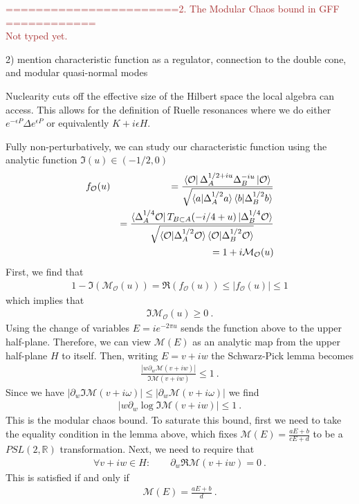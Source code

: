 \documentclass[a4paper,11pt]{article}
\theoremstyle{definition}
\newcommand{\nn}{\nonumber}
\newcommand{\mO}{\mathcal{O}}
\newcommand{\mM}{\mathcal{M}}
\newcommand{\p}{\partial}
\newcommand{\KL}[1]{\textcolor{brown}{#1}}
\begin{document}
\KL{=======================2. The Modular Chaos bound in GFF ============}\\
\KL{Not typed yet.}




2) mention characteristic function as a regulator, connection to the double cone, and modular quasi-normal modes

Nuclearity cuts off the effective size of the Hilbert space the local algebra can access. This allows for the definition of Ruelle resonances where we do either $e^{-\epsilon P} \Delta e^{\epsilon P}$ or equivalently $K+i \epsilon H$.

Fully non-perturbatively, we can study our characteristic function using the analytic function $\Im(u)\in (-1/2,0)$
\begin{eqnarray}
    f_\mO(u)&&=\frac{\bra{\mO}\Delta_A^{1/2+iu}\Delta_B^{-iu}\ket{\mO}}{\sqrt{\braket{a|\Delta_A^{1/2}a}\braket{b|\Delta_B^{1/2}b}}}\\
    &&=\frac{\bra{\Delta_A^{1/4}\mO} T_{B\subset A}(-i/4+u)\ket{\Delta_B^{1/4} \mO}}{\sqrt{\braket{\mO|\Delta_A^{1/2}\mO}\braket{\mO|\Delta_B^{1/2}\mO}}}\nn\\
    &&=1+i \mathcal{M}_{\mO}(u)
\end{eqnarray}
First, we find that 
\begin{eqnarray}
    1-\Im(\mathcal{M}_\mO(u))=\Re(f_\mO(u))\leq |f_\mO(u)|\leq 1
\end{eqnarray}
which implies that 
\begin{eqnarray}
    \Im\mathcal{M}_\mO(u)\geq 0\ .
\end{eqnarray}
Using the change of variables $E=ie^{-2\pi u}$ sends the function above to the upper half-plane. Therefore, we can view $\mM(E)$ as an analytic map from the upper half-plane $H$ to itself. Then, writing $E=v+iw$ the Schwarz-Pick lemma becomes
\begin{eqnarray}
    \frac{|w \p_w \mM(v+iw)|}{\Im \mM(v+iw)}\leq 1\ . 
\end{eqnarray}
Since we have $|\p_w \Im\mM(v+i\omega)|\leq |\p_w \mM(v+i\omega)|$ we find
\begin{eqnarray}
    |w\p_w \log \Im \mM(v+iw)|\leq 1\ .
\end{eqnarray}
This is the modular chaos bound. To saturate this bound, first we need to take the equality condition in the lemma above, which fixes $\mM(E)=\frac{a E+b}{c E+d}$ to be a $PSL(2,\mathbb{R})$ transformation. Next, we need to require that 
\begin{eqnarray}
    \forall v+iw\in H:\qquad \p_w \Re \mM(v+iw)=0\ .
\end{eqnarray}
This is satisfied if and only if 
\begin{eqnarray}
    \mM(E)=\frac{a E+b}{d}\ .
\end{eqnarray}
\end{document}
